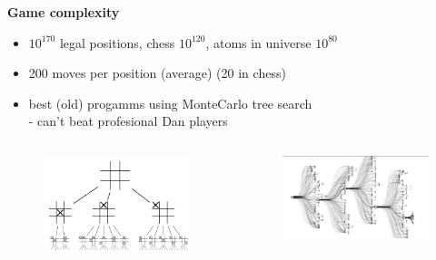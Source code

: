 \documentclass[xcolor=dvipsnames]{beamer}
\begin{document}
\begin{frame}{\bf Game complexity}

\begin{itemize}
    \item $10^{170}$ legal positions, chess $10^{120}$, atoms in universe $10^{80}$
    \item 200 moves per position (average) (20 in chess)
    \item best (old) progamms using MonteCarlo tree search \\
        - can't beat profesional Dan players
\end{itemize}

\begin{columns}
\begin{column}{0.5\textwidth}

\begin{figure}[!htb]
  \centering
  \includegraphics[scale=0.1]{../../pictures/tic_tac.png}
\end{figure}

\end{column}
\begin{column}{0.5\textwidth}  %


\begin{figure}[!htb]
  \centering
  \includegraphics[scale=0.1]{../../pictures/go_tree.png}
\end{figure}

\end{column}
\end{columns}


\end{frame}
\end{document}
